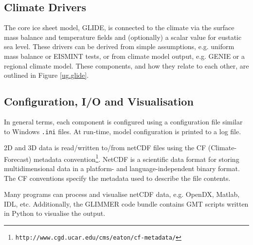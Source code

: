 \subsection{Climate Drivers}
\label{subsec:climdrive}
The core ice sheet model, GLIDE, is connected to the climate via the surface mass balance and temperature fields and (optionally) a scalar value for eustatic sea level. These drivers can be derived from simple assumptions, e.g. uniform mass balance or EISMINT tests, or from climate model output, e.g. GENIE or a regional climate model. These components, and how they relate to each other, are outlined in Figure \ref{ug.glide}.
%
%
\subsection{Configuration, I/O and Visualisation}
In general terms, each component is configured using a configuration file similar to Windows \texttt{.ini} files. At run-time, model configuration is printed to a log file. 

2D and 3D data is read/written to/from netCDF files using the CF (Climate-Forecast) metadata convention\footnote{\texttt{http://www.cgd.ucar.edu/cms/eaton/cf-metadata/}}. NetCDF is a scientific data format for storing multidimensional data in a platform- and language-independent binary format. The CF conventions specify the metadata used to describe the file contents.

Many programs can process and visualise netCDF data, e.g. OpenDX, Matlab, IDL, etc. Additionally, the GLIMMER code bundle contains GMT scripts written in Python to visualise the output.
